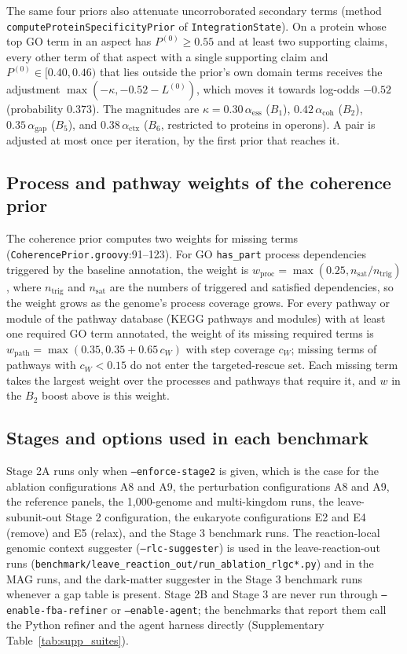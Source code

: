 \documentclass[10pt]{article}
\newcommand{\fn}[1]{\nolinkurl{#1}}
\begin{document}
The same four priors also attenuate uncorroborated secondary terms (method \texttt{computeProteinSpecificityPrior} of \texttt{IntegrationState}). On a protein whose top GO term in an aspect has $P^{(0)} \ge 0.55$ and at least two supporting claims, every other term of that aspect with a single supporting claim and $P^{(0)} \in [0.40, 0.46)$ that lies outside the prior's own domain terms receives the adjustment $\max(-\kappa, -0.52 - L^{(0)})$, which moves it towards log-odds $-0.52$ (probability $0.373$). The magnitudes are $\kappa = 0.30\,\alpha_{\text{ess}}$ ($B_1$), $0.42\,\alpha_{\text{coh}}$ ($B_2$), $0.35\,\alpha_{\text{gap}}$ ($B_5$), and $0.38\,\alpha_{\text{ctx}}$ ($B_6$, restricted to proteins in operons). A pair is adjusted at most once per iteration, by the first prior that reaches it.

\subsection{Process and pathway weights of the coherence prior}

The coherence prior computes two weights for missing terms (\fn{CoherencePrior.groovy}:91--123). For GO \fn{has_part} process dependencies triggered by the baseline annotation, the weight is $w_{\text{proc}} = \max(0.25, n_{\text{sat}}/n_{\text{trig}})$, where $n_{\text{trig}}$ and $n_{\text{sat}}$ are the numbers of triggered and satisfied dependencies, so the weight grows as the genome's process coverage grows. For every pathway or module of the pathway database (KEGG pathways and modules) with at least one required GO term annotated, the weight of its missing required terms is $w_{\text{path}} = \max(0.35, 0.35 + 0.65\,c_W)$ with step coverage $c_W$; missing terms of pathways with $c_W < 0.15$ do not enter the targeted-rescue set. Each missing term takes the largest weight over the processes and pathways that require it, and $w$ in the $B_2$ boost above is this weight.

\subsection{Stages and options used in each benchmark}

Stage 2A runs only when \texttt{--enforce-stage2} is given, which is the case for the ablation configurations A8 and A9, the perturbation configurations A8 and A9, the reference panels, the 1,000-genome and multi-kingdom runs, the leave-subunit-out Stage 2 configuration, the eukaryote configurations E2 and E4 (remove) and E5 (relax), and the Stage 3 benchmark runs. The reaction-local genomic context suggester (\texttt{--rlc-suggester}) is used in the leave-reaction-out runs (\fn{benchmark/leave_reaction_out/run_ablation_rlgc*.py}) and in the MAG runs, and the dark-matter suggester in the Stage 3 benchmark runs whenever a gap table is present. Stage 2B and Stage 3 are never run through \texttt{--enable-fba-refiner} or \texttt{--enable-agent}; the benchmarks that report them call the Python refiner and the agent harness directly (Supplementary Table~\ref{tab:supp_suites}).
\end{document}
